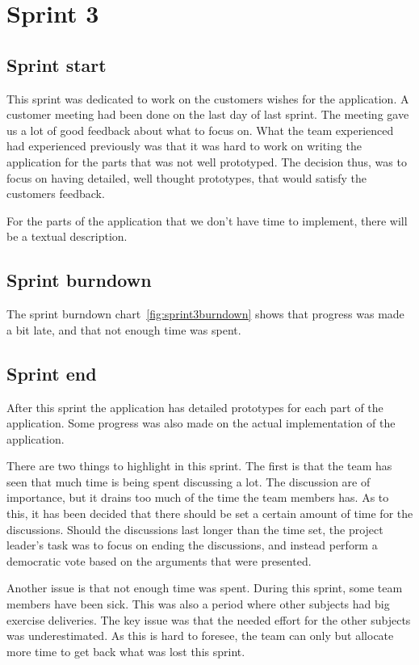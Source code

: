 \section{Sprint 3}
\subsection{Sprint start}
This sprint was dedicated to work on the customers wishes for the application. A customer meeting had been done on the last day of last sprint. The meeting gave us a lot of good feedback about what to focus on.
What the team experienced had experienced previously was that it was hard to work on writing the application for the parts that was not well prototyped.
The decision thus, was to focus on having detailed, well thought prototypes, that would satisfy the customers feedback. 

For the parts of the application that we don't have time to implement, there will be a textual description.

\subsection{Sprint burndown}

The sprint burndown chart~\ref{fig:sprint3burndown} shows that progress was made a bit late, and that not enough time was spent.





\subsection{Sprint end}
After this sprint the application has detailed prototypes for each part of the application.  Some progress was also made on the actual implementation of the application.

There are two things to highlight in this sprint. The first is that the team has seen that much time is being spent discussing a lot. The discussion are of importance, but it drains too much of the time the team members has. As to this, it has been decided that there should be set a certain amount of time for the discussions. Should the discussions last longer than the time set, the project leader's task was to focus on ending the discussions, and instead perform a democratic vote based on the arguments that were presented. 

Another issue is that not enough time was spent. During this sprint, some team  members have been sick. This was also a period where other subjects had big exercise deliveries. The key issue was that the needed effort for the other subjects was underestimated. As this is hard to foresee, the team can only but allocate more time to get back what was lost this sprint.